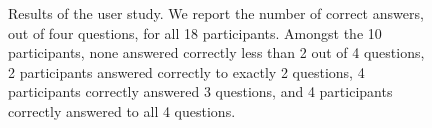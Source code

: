 \documentclass{article}
\begin{document}
\begin{figure}[h]
    \centering
    \caption{Results of the user study. We report the number of correct answers, out of four questions, for all 18 participants. Amongst the 10 participants, none answered correctly less than 2 out of 4 questions, 2 participants answered correctly to exactly 2 questions, 4 participants correctly answered 3 questions, and 4 participants correctly answered to all 4 questions.}
    \label{fig:user_study_results}
\end{figure}
\end{document}

